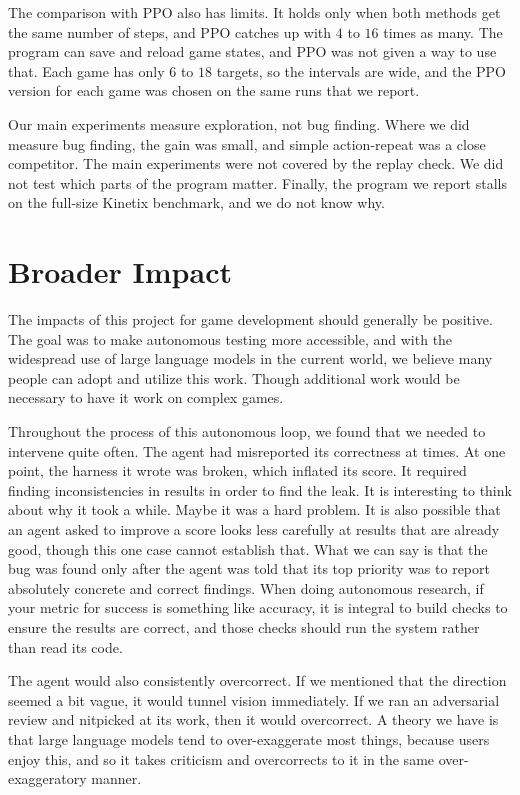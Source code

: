 \documentclass{article}
\begin{document}
The comparison with PPO also has limits. It holds only when both methods get the same number of steps, and PPO catches
up with $4$ to $16$ times as many. The program can save and reload game states, and PPO was not given a way to use
that. Each game has only $6$ to $18$ targets, so the intervals are wide, and the PPO version for each game was chosen
on the same runs that we report.

Our main experiments measure exploration, not bug finding. Where we did measure bug finding, the gain was small, and
simple action-repeat was a close competitor. The main experiments were not covered by the replay check. We did not test
which parts of the program matter. Finally, the program we report stalls on the full-size Kinetix benchmark, and we do
not know why.

\section{Broader Impact}
The impacts of this project for game development should generally be positive. The goal was to make autonomous testing more
accessible, and with the widespread use of large language models in the current world, we believe many people can adopt and
utilize this work. Though additional work would be necessary to have it work on complex games.

Throughout the process of this autonomous loop, we found that we needed to intervene quite often. The agent had misreported
its correctness at times. At one point, the harness it wrote was broken, which inflated its score. It required finding
inconsistencies in results in order to find the leak. It is interesting to think about why it took a while. Maybe it was a
hard problem. It is also possible that an agent asked to improve a score looks less carefully at results that are already
good, though this one case cannot establish that. What we can say is that the bug was found only after the agent was told
that its top priority was to report absolutely concrete and correct findings. When doing autonomous research, if your metric
for success is something like accuracy, it is integral to build checks to ensure the results are correct, and those checks
should run the system rather than read its code.

The agent would also consistently overcorrect. If we mentioned that the direction seemed a bit vague, it would tunnel
vision immediately. If we ran an adversarial review and nitpicked at its work, then it would overcorrect. A theory we have
is that large language models tend to over-exaggerate most things, because users enjoy this, and so it takes criticism and
overcorrects to it in the same over-exaggeratory manner.
\end{document}
